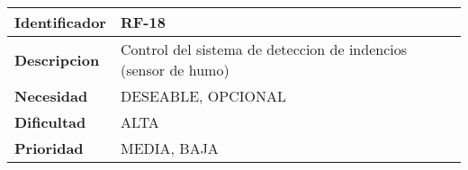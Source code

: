 \begin{center}
    \begin{tabular}{|p{2.6cm}|p{12cm}|}
    \hline
    \textbf{Identificador} & RF-18\\
    \hline
    \textbf{Descripcion} & Control del sistema de deteccion de indencios (sensor de humo)\\
    \hline
    \textbf{Necesidad} & DESEABLE, OPCIONAL\\
    \hline
    \textbf{Dificultad} & ALTA\\
    \hline
    \textbf{Prioridad} & MEDIA, BAJA\\
    \hline
    \end{tabular}
\end{center}
